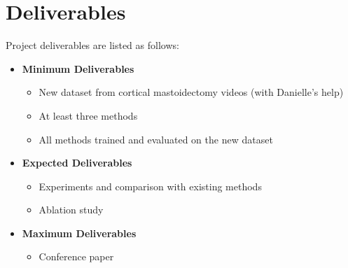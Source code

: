 \documentclass[11pt]{article} \usepackage[top=1in, bottom=1in, left=1in, right=1in]{geometry}
\begin{document}
\section{Deliverables}
Project deliverables are listed as follows:
\begin{itemize}
    \item \textbf{Minimum Deliverables}
    \begin{itemize}
        \item New dataset from cortical mastoidectomy videos (with Danielle's help)
        \item At least three methods
        \item All methods trained and evaluated on the new dataset
    \end{itemize}
    \item \textbf{Expected Deliverables}
    \begin{itemize}
        \item Experiments and comparison with existing methods
        \item Ablation study
    \end{itemize}
    \item \textbf{Maximum Deliverables}
    \begin{itemize}
        \item Conference paper
    \end{itemize}
\end{itemize}
\end{document}

